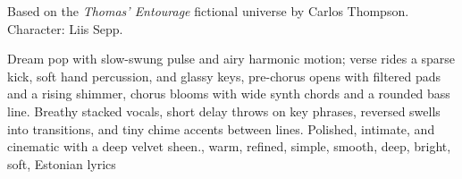 

\begin{notes}
Based on the \emph{Thomas’ Entourage} fictional universe by Carlos Thompson.\\
Character: Liis Sepp.\\
\end{notes}

\begin{style}
Dream pop with slow-swung pulse and airy harmonic motion; verse rides a sparse kick, soft hand percussion, and glassy keys, pre-chorus opens with filtered pads and a rising shimmer, chorus blooms with wide synth chords and a rounded bass line. %
Breathy stacked vocals, short delay throws on key phrases, reversed swells into transitions, and tiny chime accents between lines. %
Polished, intimate, and cinematic with a deep velvet sheen., warm, refined, simple, smooth, deep, bright, soft, Estonian lyrics
\end{style}

